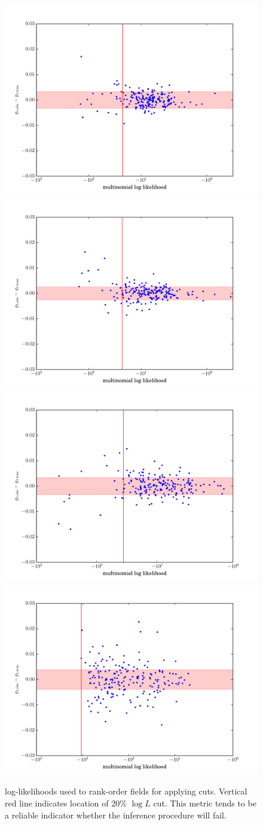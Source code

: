 \documentclass[iop]{emulateapj}
\begin{document}
\begin{figure}[t]
\begin{center}
\includegraphics[width=0.48\linewidth]{./Plots/logL1-regauss-opt-shear_plots.pdf}
\includegraphics[width=0.48\linewidth]{./Plots/logL1-rgc-regauss-opt-shear_plots.pdf}
\includegraphics[width=0.48\linewidth]{./Plots/logL1-ksb-opt-shear_plots.pdf}
\includegraphics[width=0.48\linewidth]{./Plots/logL1-moments-opt-shear_plots.pdf}
\end{center}
\caption{log-likelihoods used to rank-order fields for applying
  cuts. Vertical red line indicates location of $20\%$ $\log L$
  cut. This metric tends to be a reliable indicator whether
  the inference procedure will fail.}
\end{figure}
\end{document}
